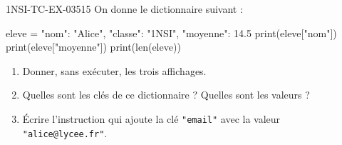 \begin{exercice}{1NSI-TC-EX-035}{1}{5}
On donne le dictionnaire suivant :
\begin{python}
eleve = {"nom": "Alice", "classe": "1NSI", "moyenne": 14.5}
print(eleve["nom"])
print(eleve["moyenne"])
print(len(eleve))
\end{python}
\begin{enumerate}
  \item Donner, sans exécuter, les trois affichages.
  \item Quelles sont les clés de ce dictionnaire ? Quelles sont les valeurs ?
  \item Écrire l'instruction qui ajoute la clé \lstinline{"email"} avec la valeur
        \lstinline{"alice@lycee.fr"}.
\end{enumerate}
\end{exercice}
